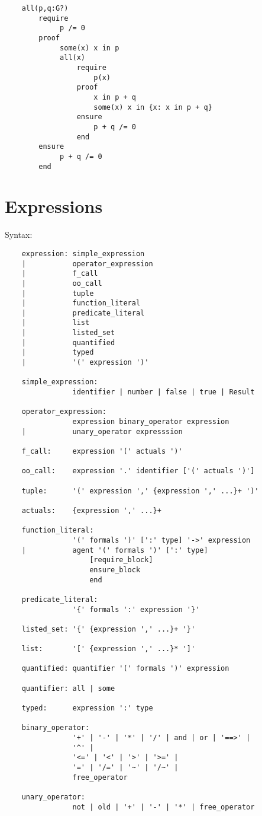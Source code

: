 \begin{lstlisting}
    all(p,q:G?)
        require
             p /= 0
        proof
             some(x) x in p
             all(x)
                 require
                     p(x)
                 proof
                     x in p + q
                     some(x) x in {x: x in p + q}
                 ensure
                     p + q /= 0
                 end
        ensure
             p + q /= 0
        end
\end{lstlisting}



\section{Expressions}

\noindent Syntax:
\begin{lstlisting}
    expression: simple_expression
    |           operator_expression
    |           f_call
    |           oo_call
    |           tuple
    |           function_literal
    |           predicate_literal
    |           list
    |           listed_set
    |           quantified
    |           typed
    |           '(' expression ')'

    simple_expression:
                identifier | number | false | true | Result

    operator_expression:
                expression binary_operator expression
    |           unary_operator expresssion
    
    f_call:     expression '(' actuals ')'

    oo_call:    expression '.' identifier ['(' actuals ')']

    tuple:      '(' expression ',' {expression ',' ...}+ ')'

    actuals:    {expression ',' ...}+

    function_literal:
                '(' formals ')' [':' type] '->' expression
    |           agent '(' formals ')' [':' type]
                    [require_block]
                    ensure_block
                    end
                   
    predicate_literal:
                '{' formals ':' expression '}'

    listed_set: '{' {expression ',' ...}+ '}'

    list:       '[' {expression ',' ...}* ']'

    quantified: quantifier '(' formals ')' expression

    quantifier: all | some

    typed:      expression ':' type

    binary_operator:
                '+' | '-' | '*' | '/' | and | or | '==>' |
                '^' |
                '<=' | '<' | '>' | '>=' |
                '=' | '/=' | '~' | '/~' |
                free_operator

    unary_operator:
                not | old | '+' | '-' | '*' | free_operator
\end{lstlisting}

